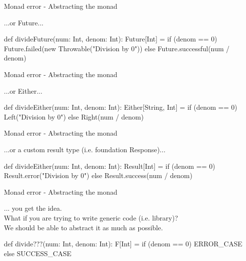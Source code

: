 \documentclass[13pt]{beamer}
\begin{document}
\begin{frame}[fragile]{Monad error - Abstracting the monad}

  ...or Future...

  \begin{scalaCode}
    def divideFuture(num: Int, denom: Int): Future[Int] =
      if (denom == 0) Future.failed(new Throwable("Division by 0"))
      else Future.successful(num / denom)
  \end{scalaCode}

\end{frame}

\begin{frame}[fragile]{Monad error - Abstracting the monad}

  ...or Either...

  \begin{scalaCode}
    def divideEither(num: Int, denom: Int): Either[String, Int] =
      if (denom == 0) Left("Division by 0")
      else Right(num / denom)
  \end{scalaCode}

\end{frame}

\begin{frame}[fragile]{Monad error - Abstracting the monad}

  ...or a custom result type (i.e. foundation Response)...

  \begin{scalaCode}
    def divideEither(num: Int, denom: Int): Result[Int] =
      if (denom == 0) Result.error("Division by 0")
      else Result.success(num / denom)
  \end{scalaCode}

\end{frame}


\begin{frame}[fragile]{Monad error - Abstracting the monad}

  ... you get the idea.\\

  What if you are trying to write generic code (i.e. library)?\\
  We should be able to abstract it as much as possible.

  \begin{scalaCode}
    def divide???(num: Int, denom: Int): F[Int] =
      if (denom == 0) ERROR_CASE
      else SUCCESS_CASE
  \end{scalaCode}

\end{frame}
\end{document}
